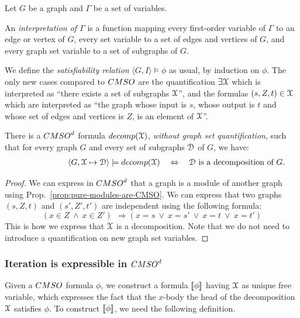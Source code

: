 \begin{definition} Let $G$ be a graph and $\Gamma$ be a set of variables.  

An \emph{interpretation of $\Gamma$} is a function mapping every first-order variable of $\Gamma$ to an edge or vertex of $G$, every set variable to a set of edges and vertices of $G$, and every graph set variable to a set of subgraphs of $G$.    

We define the \emph{satisfiability relation} $\langle G, I\rangle\models \phi$ as usual, by induction on  $\phi$. The only new cases compared to $\CMSO$ are the quantification  $\exists \mathcal X$ which is interpreted as ``there exists a set of subgraphs $\mathcal X$'', and the formulas $(s,Z,t)\in \mathcal X$ which are interpreted as ``the graph whose input is $s$, whose output is $t$ and whose set of edges and vertices is $Z$, is an element of $\mathcal X$''.  
\end{definition}
\begin{proposition}\label{prop:def-decomp}
There is a $\CMSOd$ formula $\mathsf{decomp}(\cX)$, \emph{without graph set quantification}, such that for every graph $G$ and every set of subgraphs $\mathcal D$ of $G$, we have:
\begin{align*}
\qquad\qquad\qquad\langle G, \cX\mapsto \cD\rangle\models \mathsf{decomp}(\cX)\quad \Leftrightarrow \quad  \cD \text{ is a decomposition of } G.
\end{align*}
\end{proposition}
\begin{proof} 
We can express in $\CMSOd$ that a graph is a module of another graph using Prop.~\ref{prop:pure-modules-are-CMSO}. We can express that two graphs $(s,Z,t)$ and $(s',Z',t')$ are independent using the following formula:
$$ (x\in Z\  \wedge\  x\in Z')\ \ \Rightarrow (x=s\  \vee\  x=s'\  \vee\  x=t\ \vee\ x=t')$$
 This is how we express that $\mathcal X$ is a decomposition. Note that we do not need to introduce a  quantification on new graph set variables. 
\end{proof}


\subsubsection{Iteration is expressible in $\CMSOd$}

Given a $\CMSO$ formula $\phi$, we construct a formula $\left\llbracket {\phi}\right\rrbracket$ having $\mathcal X$ as unique free variable, which expresses the fact that the $x$-body the head of the decomposition $\mathcal X$ satisfies $\phi$. To construct $\left\llbracket {\phi}\right\rrbracket$, we need the following definition.

